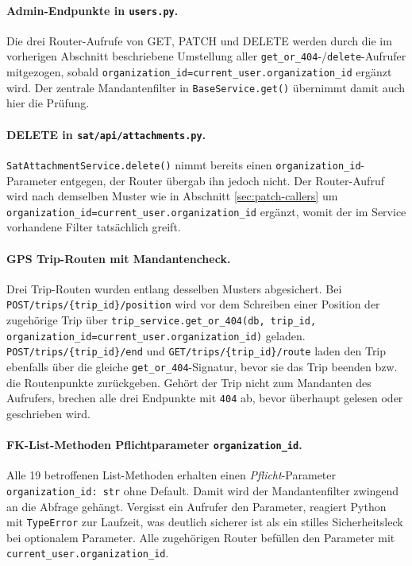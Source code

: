 \paragraph{Admin-Endpunkte in \texttt{users.py}.}
Die drei Router-Aufrufe von GET, PATCH und DELETE werden durch die im
vorherigen Abschnitt beschriebene Umstellung aller
\texttt{get\_or\_404}-/\texttt{delete}-Aufrufer mitgezogen, sobald
\texttt{organization\_id=\allowbreak current\_user.\allowbreak organization\_id}
ergänzt wird. Der zentrale Mandantenfilter in \texttt{BaseService.get()}
übernimmt damit auch hier die Prüfung.

\paragraph{DELETE in \texttt{sat/api/attachments.py}.}
\texttt{SatAttachmentService.delete()} nimmt bereits einen
\texttt{organization\_id}-Parameter entgegen, der Router übergab ihn
jedoch nicht. Der Router-Aufruf wird nach demselben Muster wie in
Abschnitt \ref{sec:patch-callers} um
\texttt{organization\_id=\allowbreak current\_user.\allowbreak organization\_id}
ergänzt, womit der im Service vorhandene Filter tatsächlich greift.

\paragraph{GPS \textendash{} Trip-Routen mit Mandantencheck.}
\begin{sloppypar}
Drei Trip-Routen wurden entlang desselben Musters abgesichert.
Bei \texttt{POST\allowbreak /trips/\allowbreak \{trip\_id\}/\allowbreak position}
wird vor dem Schreiben einer Position der zugehörige Trip über
\texttt{trip\_service.\allowbreak get\_or\_404(db,\allowbreak{} trip\_id,\allowbreak{}
organization\_id=current\_user.\allowbreak organization\_id)} geladen.
\texttt{POST\allowbreak /trips/\allowbreak \{trip\_id\}/\allowbreak end} und
\texttt{GET\allowbreak /trips/\allowbreak \{trip\_id\}/\allowbreak route}
laden den Trip ebenfalls über die gleiche \texttt{get\_or\_404}-Signatur,
bevor sie das Trip beenden bzw. die Routenpunkte zurückgeben. Gehört der
Trip nicht zum Mandanten des Aufrufers, brechen alle drei Endpunkte mit
\texttt{404} ab, bevor überhaupt gelesen oder geschrieben wird.
\end{sloppypar}

\paragraph{FK-List-Methoden \textendash{} Pflichtparameter
\texttt{organization\_id}.}
Alle 19 betroffenen List-Methoden erhalten einen
\textit{Pflicht}-Parameter \texttt{organization\_id: str} ohne Default.
Damit wird der Mandantenfilter zwingend an die Abfrage gehängt.
Vergisst ein Aufrufer den Parameter, reagiert Python mit
\texttt{TypeError} zur Laufzeit, was deutlich sicherer ist als ein
stilles Sicherheitsleck bei optionalem Parameter. Alle zugehörigen
Router befüllen den Parameter mit
\texttt{current\_user.\allowbreak organization\_id}.

